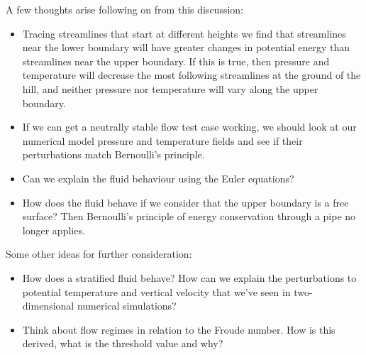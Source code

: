 \documentclass{article}
\begin{document}
A few thoughts arise following on from this discussion:
\begin{itemize}
	\item Tracing streamlines that start at different heights we find that streamlines near the lower boundary will have greater changes in potential energy than streamlines near the upper boundary.  If this is true, then pressure and temperature will decrease the most following streamlines at the ground of the hill, and neither pressure nor temperature will vary along the upper boundary.
	\item If we can get a neutrally stable flow test case working, we should look at our numerical model pressure and temperature fields and see if their perturbations match Bernoulli's principle.
	\item Can we explain the fluid behaviour using the Euler equations?
	\item How does the fluid behave if we consider that the upper boundary is a free surface?  Then Bernoulli's principle of energy conservation through a pipe no longer applies.
\end{itemize}
Some other ideas for further consideration:
\begin{itemize}
	\item How does a stratified fluid behave?  How can we explain the perturbations to potential temperature and vertical velocity that we've seen in two-dimensional numerical simulations?
	\item Think about flow regimes in relation to the Froude number.  How is this derived, what is the threshold value and why?
\end{itemize}




\end{document}

